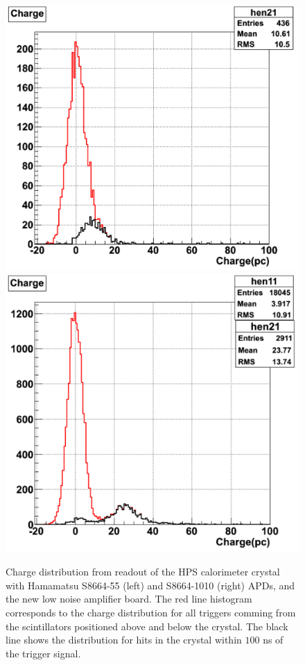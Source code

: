 \begin{enumerate}
\begin{figure}[t]
\includegraphics[scale=0.37]{ecal/MIP_5x5_APD.png}
\includegraphics[scale=0.37]{ecal/MIP_10x10_APD.png}
\caption{\small{Charge distribution from readout of the HPS calorimeter crystal with Hamamatsu S8664-55 (left) and S8664-1010 
(right) APDs, and the new low noise amplifier board. The red line histogram corresponds to the charge distribution for all triggers 
comming from the scintillators positioned above and below the crystal. The black line shows the distribution for hits in the crystal 
within $100$ ns of the trigger signal. }}\label{fig:mip10x10}
\end{figure}

\end{enumerate}


